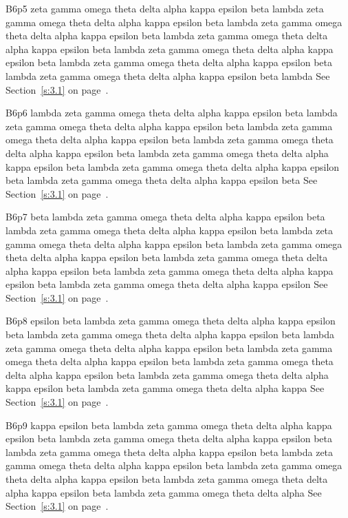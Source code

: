B6p5 zeta gamma omega theta delta alpha kappa epsilon beta lambda zeta gamma omega theta delta alpha kappa epsilon beta lambda zeta gamma omega theta delta alpha kappa epsilon beta lambda zeta gamma omega theta delta alpha kappa epsilon beta lambda zeta gamma omega theta delta alpha kappa epsilon beta lambda zeta gamma omega theta delta alpha kappa epsilon beta lambda zeta gamma omega theta delta alpha kappa epsilon beta lambda See Section~\ref{s:3.1} on page~\pageref{s:3.1}.

B6p6 lambda zeta gamma omega theta delta alpha kappa epsilon beta lambda zeta gamma omega theta delta alpha kappa epsilon beta lambda zeta gamma omega theta delta alpha kappa epsilon beta lambda zeta gamma omega theta delta alpha kappa epsilon beta lambda zeta gamma omega theta delta alpha kappa epsilon beta lambda zeta gamma omega theta delta alpha kappa epsilon beta lambda zeta gamma omega theta delta alpha kappa epsilon beta See Section~\ref{s:3.1} on page~\pageref{s:3.1}.

B6p7 beta lambda zeta gamma omega theta delta alpha kappa epsilon beta lambda zeta gamma omega theta delta alpha kappa epsilon beta lambda zeta gamma omega theta delta alpha kappa epsilon beta lambda zeta gamma omega theta delta alpha kappa epsilon beta lambda zeta gamma omega theta delta alpha kappa epsilon beta lambda zeta gamma omega theta delta alpha kappa epsilon beta lambda zeta gamma omega theta delta alpha kappa epsilon See Section~\ref{s:3.1} on page~\pageref{s:3.1}.

B6p8 epsilon beta lambda zeta gamma omega theta delta alpha kappa epsilon beta lambda zeta gamma omega theta delta alpha kappa epsilon beta lambda zeta gamma omega theta delta alpha kappa epsilon beta lambda zeta gamma omega theta delta alpha kappa epsilon beta lambda zeta gamma omega theta delta alpha kappa epsilon beta lambda zeta gamma omega theta delta alpha kappa epsilon beta lambda zeta gamma omega theta delta alpha kappa See Section~\ref{s:3.1} on page~\pageref{s:3.1}.

B6p9 kappa epsilon beta lambda zeta gamma omega theta delta alpha kappa epsilon beta lambda zeta gamma omega theta delta alpha kappa epsilon beta lambda zeta gamma omega theta delta alpha kappa epsilon beta lambda zeta gamma omega theta delta alpha kappa epsilon beta lambda zeta gamma omega theta delta alpha kappa epsilon beta lambda zeta gamma omega theta delta alpha kappa epsilon beta lambda zeta gamma omega theta delta alpha See Section~\ref{s:3.1} on page~\pageref{s:3.1}.

